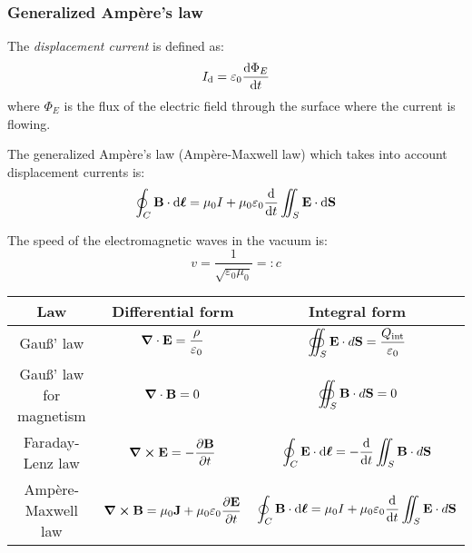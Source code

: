 \documentclass[../../../main.tex]{subfiles}
\begin{document}
\begin{multicols}{2}
    \subsubsection{Generalized Ampère's law}
    \begin{definition}
        The \textit{displacement current} is defined as: $$I_\text{d}=\varepsilon_0\dv{\Phi_E}{t}$$ where $\Phi_E$ is the flux of the electric field through the surface where the current is flowing.
    \end{definition}
    \begin{law}
        The generalized Ampère's law (Ampère-Maxwell law) which takes into account displacement currents is: $$\oint_C\boldsymbol{\mathrm{B}}\cdot \dd\boldsymbol{\mathrm{\ell}}=\mu_0 I+\mu_0\varepsilon_0\dv{}{t}\iint_S\boldsymbol{\mathrm{E}}\cdot \dd\boldsymbol{\mathrm{S}}$$
    \end{law}
    \begin{definition}
        The speed of the electromagnetic waves in the vacuum is: $$v=\frac{1}{\sqrt{\varepsilon_0\mu_0}}=:c$$
    \end{definition}
\end{multicols}
\begin{table}[ht]
    \centering
    \renewcommand{\arraystretch}{2.5}
    \begin{tabular}{|c|c|c|}
        \hline
        \bfseries Law             & \bfseries Differential form                                                                                & \bfseries Integral form                                                                                      \\
        \hline
        Gau\ss' law               & $\displaystyle \boldsymbol{\mathrm{\grad}}\cdot\boldsymbol{\mathrm{E}}=\frac{\rho}{\varepsilon_0}$                                           & $\displaystyle \oiint_S\boldsymbol{\mathrm{E}}\cdot d\boldsymbol{\mathrm{S}}=\frac{Q_{\text{int}}}{\varepsilon_0}$                             \\
        \hline
        Gau\ss' law for magnetism & $\displaystyle \boldsymbol{\mathrm{\grad}}\cdot\boldsymbol{\mathrm{B}}=0$                                                                    & $\displaystyle \oiint_S\boldsymbol{\mathrm{B}}\cdot d\boldsymbol{\mathrm{S}}=0$                                                                \\
        \hline
        Faraday-Lenz law          & $\displaystyle \vf{\grad}\crossprod\vf{E}=-\frac{\partial\vf{B}}{\partial t}$                              & $\displaystyle \oint_C\boldsymbol{\mathrm{E}}\cdot \dd\boldsymbol{\mathrm{\ell}}=-\dv{}{t}\iint_S\boldsymbol{\mathrm{B}}\cdot d\boldsymbol{\mathrm{S}}$                          \\
        \hline
        Ampère-Maxwell law        & $\displaystyle \vf{\grad}\crossprod\vf{B}=\mu_0\vf{J}+\mu_0\varepsilon_0\frac{\partial\vf{E}}{\partial t}$ & $\displaystyle \oint_C\boldsymbol{\mathrm{B}}\cdot \dd\boldsymbol{\mathrm{\ell}}=\mu_0 I+\mu_0\varepsilon_0\dv{}{t}\iint_S\boldsymbol{\mathrm{E}}\cdot d\boldsymbol{\mathrm{S}}$ \\
        \hline
    \end{tabular}
\end{table}
\end{document}
